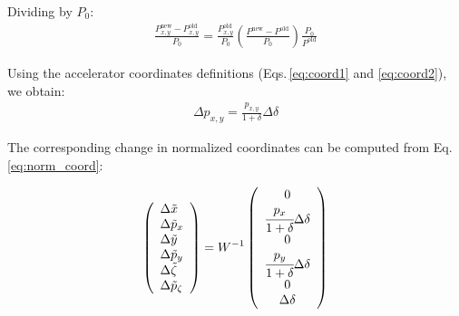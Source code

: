 Dividing by $P_0$:
\begin{align}
\frac{P_{x,y}^\text{new} - P_{x,y}^\text{old}}{P_0} = 
\frac{P_{x,y}^\text{old}}{P_0}
\left(\frac{P^\text{new} - P^\text{old}}{P_0} \right) 
\frac{P_0}{P^\text{old}}
\end{align}

Using the accelerator coordinates definitions (Eqs.\,\ref{eq:coord1} and \ref{eq:coord2}), we obtain:
\begin{align}
\Delta p_{x,y} = \frac{p_{x,y}}{1 + \delta} \Delta \delta
\end{align}

The corresponding change in normalized coordinates can be computed from Eq.\,\ref{eq:norm_coord}:

\begin{equation}
\left(\begin{array}{l}
\Delta \tilde{x} \\
\Delta \tilde{p}_x\\
\Delta \tilde{y} \\
\Delta \tilde{p}_y \\
\Delta \tilde{\zeta} \\
\Delta \tilde{p}_\zeta
\end{array}\right)
=
W^{-1}
\left(\begin{array}{c}
0 \\
\cfrac{p_{x}}{1 + \delta} \Delta \delta \\
0 \\
\cfrac{p_{y}}{1 + \delta} \Delta \delta \\
0 \\
\Delta \delta
\end{array}\right)
\label{eq:norm_coord}
\end{equation}

